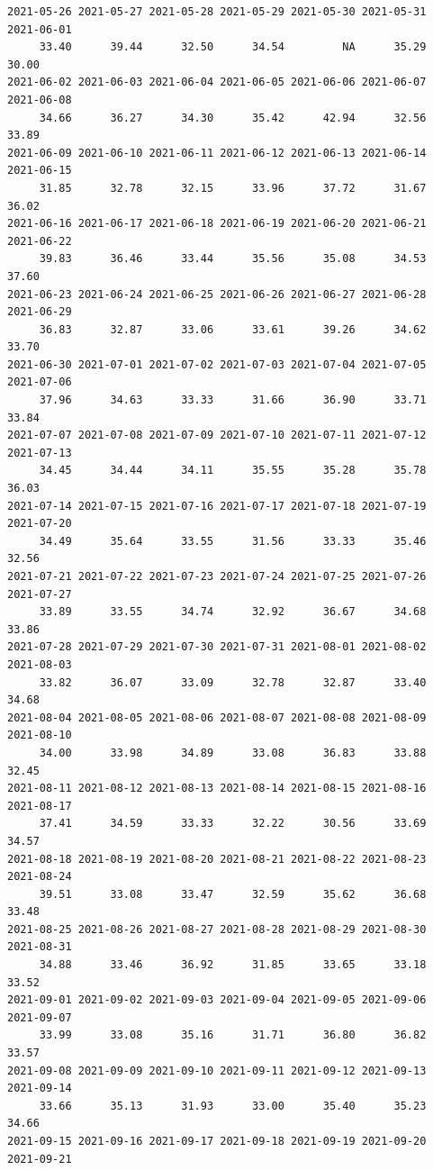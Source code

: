 \documentclass[
  letterpaper,
  DIV=11,
  numbers=noendperiod]{scrartcl}
\begin{document}
\begin{verbatim}
2021-05-26 2021-05-27 2021-05-28 2021-05-29 2021-05-30 2021-05-31 2021-06-01 
     33.40      39.44      32.50      34.54         NA      35.29      30.00 
2021-06-02 2021-06-03 2021-06-04 2021-06-05 2021-06-06 2021-06-07 2021-06-08 
     34.66      36.27      34.30      35.42      42.94      32.56      33.89 
2021-06-09 2021-06-10 2021-06-11 2021-06-12 2021-06-13 2021-06-14 2021-06-15 
     31.85      32.78      32.15      33.96      37.72      31.67      36.02 
2021-06-16 2021-06-17 2021-06-18 2021-06-19 2021-06-20 2021-06-21 2021-06-22 
     39.83      36.46      33.44      35.56      35.08      34.53      37.60 
2021-06-23 2021-06-24 2021-06-25 2021-06-26 2021-06-27 2021-06-28 2021-06-29 
     36.83      32.87      33.06      33.61      39.26      34.62      33.70 
2021-06-30 2021-07-01 2021-07-02 2021-07-03 2021-07-04 2021-07-05 2021-07-06 
     37.96      34.63      33.33      31.66      36.90      33.71      33.84 
2021-07-07 2021-07-08 2021-07-09 2021-07-10 2021-07-11 2021-07-12 2021-07-13 
     34.45      34.44      34.11      35.55      35.28      35.78      36.03 
2021-07-14 2021-07-15 2021-07-16 2021-07-17 2021-07-18 2021-07-19 2021-07-20 
     34.49      35.64      33.55      31.56      33.33      35.46      32.56 
2021-07-21 2021-07-22 2021-07-23 2021-07-24 2021-07-25 2021-07-26 2021-07-27 
     33.89      33.55      34.74      32.92      36.67      34.68      33.86 
2021-07-28 2021-07-29 2021-07-30 2021-07-31 2021-08-01 2021-08-02 2021-08-03 
     33.82      36.07      33.09      32.78      32.87      33.40      34.68 
2021-08-04 2021-08-05 2021-08-06 2021-08-07 2021-08-08 2021-08-09 2021-08-10 
     34.00      33.98      34.89      33.08      36.83      33.88      32.45 
2021-08-11 2021-08-12 2021-08-13 2021-08-14 2021-08-15 2021-08-16 2021-08-17 
     37.41      34.59      33.33      32.22      30.56      33.69      34.57 
2021-08-18 2021-08-19 2021-08-20 2021-08-21 2021-08-22 2021-08-23 2021-08-24 
     39.51      33.08      33.47      32.59      35.62      36.68      33.48 
2021-08-25 2021-08-26 2021-08-27 2021-08-28 2021-08-29 2021-08-30 2021-08-31 
     34.88      33.46      36.92      31.85      33.65      33.18      33.52 
2021-09-01 2021-09-02 2021-09-03 2021-09-04 2021-09-05 2021-09-06 2021-09-07 
     33.99      33.08      35.16      31.71      36.80      36.82      33.57 
2021-09-08 2021-09-09 2021-09-10 2021-09-11 2021-09-12 2021-09-13 2021-09-14 
     33.66      35.13      31.93      33.00      35.40      35.23      34.66 
2021-09-15 2021-09-16 2021-09-17 2021-09-18 2021-09-19 2021-09-20 2021-09-21 

\end{verbatim}
\end{document}
